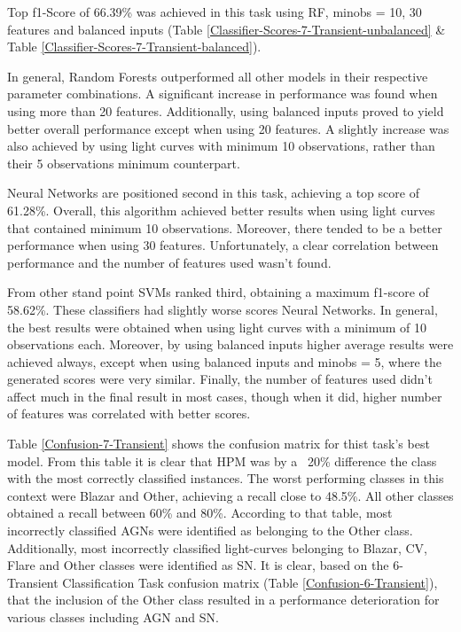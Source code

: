 \documentclass[a4paper,fleqn,usenatbib]{mnras}
\begin{document}
Top f1-Score of 66.39\% was achieved in this task using RF, min\textunderscore obs = 10, 30 features and balanced inputs (Table \ref{Classifier-Scores-7-Transient-unbalanced} \& Table \ref{Classifier-Scores-7-Transient-balanced}).

In general, Random Forests outperformed all other models in their respective parameter combinations. A significant increase in performance was found when using more than 20 features. Additionally, using balanced inputs proved to yield better overall performance except when using 20 features. A slightly increase was also achieved by using light curves with minimum 10 observations, rather than their 5 observations minimum counterpart.

Neural Networks are positioned second in this task, achieving a top score of 61.28\%. Overall, this algorithm achieved better results when using light curves that contained minimum 10 observations. Moreover, there tended to be a better performance when using 30 features. Unfortunately, a clear correlation between performance and the number of features used wasn't found.

From other stand point SVMs ranked third, obtaining a maximum f1-score of 58.62\%. These classifiers had slightly worse scores Neural Networks. In general, the best results were obtained when using light curves with a minimum of 10 observations each. Moreover, by using balanced inputs higher average results were achieved always, except when using balanced inputs and min\textunderscore obs = 5, where the generated scores were very similar. Finally, the number of features used didn't affect much in the final result in most cases, though when it did, higher number of features was correlated with better scores.

Table \ref{Confusion-7-Transient} shows the confusion matrix for thist task's best model. From this table it is clear that HPM was by a ~20\% difference the class with the most correctly classified instances. The worst performing classes in this context were Blazar and Other, achieving a recall close to 48.5\%. All other classes obtained a recall between 60\% and 80\%. According to that table, most incorrectly classified AGNs were identified as belonging to the Other class. Additionally, most incorrectly classified light-curves belonging to Blazar, CV, Flare and Other classes were identified as SN. It is clear, based on the 6-Transient Classification Task confusion matrix (Table \ref{Confusion-6-Transient}), that the inclusion of the Other class resulted in a performance deterioration for various classes including AGN and SN.
\end{document}
